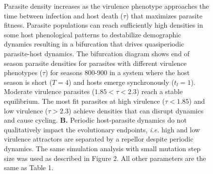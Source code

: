 \documentclass{article}
\begin{document}
\begin{figure}[hb!]
{    Parasite density increases as the virulence phenotype approaches the time between infection and host death ($\tau$) that maximizes parasite fitness\cite{macdonald2021host}. Parasite populations can reach sufficiently high densities in some host phenological patterns to destabilize demographic dynamics resulting in a bifurcation that drives quasiperiodic parasite-host dynamics. The bifurcation diagram shows end of season parasite densities for parasites with different virulence phenotypes ($\tau$) for seasons 800-900 in a system where the host season is short ($T=4$) and hosts emerge synchronously ($t_{l}=1$). Moderate virulence parasites ($1.85<\tau<2.3$) reach a stable  equilibrium. The most fit parasites at high virulence ($\tau<1.85$) and low virulence ($\tau>2.3$) achieve densities that can disrupt dynamics and cause cycling. \textbf{B.} Periodic host-parasite dynamics do not qualitatively impact the evolutionary endpoints, \textit{i.e.} high and low virulence attractors are separated by a repellor despite periodic dynamics. The same simulation analysis with small mutation step size was used as described in Figure 2. All other parameters are the same as Table 1.
    }
\end{figure}

\end{document}
